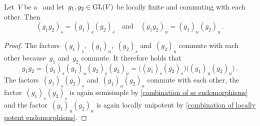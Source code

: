 \begin{lemma}
  \label{local mjcd for commuting endomorphisms}
  Let~$V$ be a~ and let~$g_1, g_2 \in \operatorname{GL}(V)$ be locally finite and commuting with each other.
  Then
  \[
      ( g_1 g_2 )_s
    = ( g_1 )_s ( g_2 )_s
    \quad\text{and}\quad
      ( g_1 g_2 )_u
    = ( g_1 )_u ( g_2 )_u \,.
  \]
\end{lemma}


\begin{proof}
  The factors~$(g_1)_s$,~$(g_1)_u$,~$(g_2)_s$ and~$(g_2)_u$ commute with each other because~$g_1$ and~$g_2$ commute.
  It therefore holds that
  \[
      g_1 g_2
    = (g_1)_s (g_1)_u (g_2)_s (g_2)_u
    = \bigl( (g_1)_s (g_2)_s \bigr) \bigl( (g_1)_u (g_2)_u \bigr) \,.
  \]
  The factors~$(g_1)_s (g_2)_s$ and~$(g_1)_u (g_2)_u$ commute with each other, the factor~$(g_1)_s (g_2)_s$ is again semisimple by \cref{combination of ss endomorphisms} and the factor~$(g_1)_u (g_2)_u$ is again locally unipotent by \cref{combination of locally potent endomorphisms}.
\end{proof}




